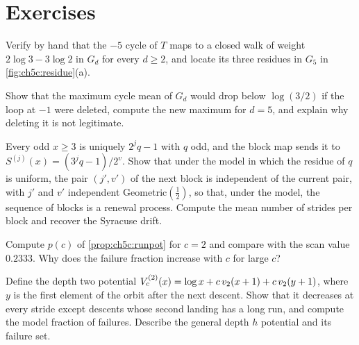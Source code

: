 \section*{Exercises}

\begin{exercise}
Verify by hand that the $-5$ cycle of $T$ maps to a closed walk of weight
$2\log3-3\log2$ in $G_d$ for every $d\ge2$, and locate its three residues in
$G_5$ in \cref{fig:ch5c:residue}(a).
\end{exercise}

\begin{exercise}
Show that the maximum cycle mean of $G_d$ would drop below $\log(3/2)$ if the
loop at $-1$ were deleted, compute the new maximum for $d=5$, and explain why
deleting it is not legitimate.
\end{exercise}

\begin{exercise}
Every odd $x\ge3$ is uniquely $2^jq-1$ with $q$ odd, and the block map sends it
to $S^{(j)}(x)=(3^jq-1)/2^v$. Show that under the model in which the residue of
$q$ is uniform, the pair $(j',v')$ of the next block is independent of the
current pair, with $j'$ and $v'$ independent Geometric$(\tfrac12)$, so that,
under the model, the sequence of blocks is a renewal process. Compute the mean
number of strides per block and recover the Syracuse drift.
\end{exercise}

\begin{exercise}
Compute $p(c)$ of \cref{prop:ch5c:runpot} for $c=2$ and compare with the scan
value $0.2333$. Why does the failure fraction increase with $c$ for large $c$?
\end{exercise}

\begin{exercise}
Define the depth two potential $V^{(2)}_c(x)=\log x+c\,v_2(x+1)+c\,v_2(y+1)$,
where $y$ is the first element of the orbit after the next descent. Show that
it decreases at every stride except descents whose second landing has a long
run, and compute the model fraction of failures. Describe the general depth $h$
potential and its failure set.
\end{exercise}
